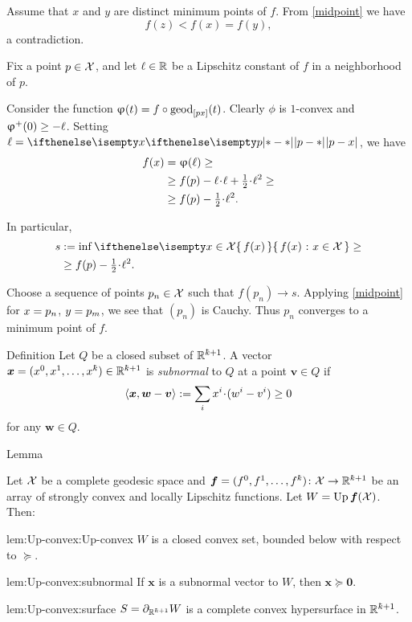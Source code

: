 Assume that $x$ and $y$ are distinct minimum points of $f$. 
From \ref{midpoint} we have
\[f(z)<f(x)=f(y),\] 
a contradiction. 

Fix a point $p\in \spc{X}$, and
let $\Lip\in\RR$ be a Lipschitz constant of $f$ in a neighborhood of $p$.

Consider the function $\phi(t)=f\circ\geod_{[px]}(t)$.
Clearly $\phi$ is $1$-convex and $\phi^+(0)\ge -\Lip$.
Setting $\ell=\dist{p}{x}{}$, we have 
\begin{align*}
f(x)
&=
\phi(\ell)
\ge
\\
&\ge
f(p)-\Lip\cdot\ell+\tfrac{1}{2}\cdot\ell^2
\ge
\\
&\ge f(p)-\tfrac{1}{2}\cdot{\Lip^2}.
\end{align*}

In particular,
\begin{align*}
s
&\df
\inf\set{f(x)}{x\in \spc{X}}
\ge
\\
&\ge
f(p)-\tfrac{1}{2}\cdot{\Lip^2}.
\end{align*}

Choose a sequence of points $p_n\in \spc{X}$ such that $f(p_n)\to s$.
Applying \ref{midpoint} for $x\z=p_n$, $y\z=p_m$, we see that $(p_n)$ is Cauchy. Thus $p_n$ converges to a minimum point of $f$.
\qeds

\begin{thm}{Definition}
Let $Q$ be a closed subset of $\RR^{\kay+1}$.
A vector $\bm{x}\z=(x^0,x^1,\dots,x^\kay)\in\RR^{\kay+1}$
is \emph{subnormal} to $Q$ at a point $\bm{v}\in Q$ 
if
\[\<\bm{x},\bm{w}-\bm{v}\>
\df
\sum_ix^i\cdot(w^i-v^i)
\ge 0\]
for any $\bm{w}\in Q$.
\end{thm}


\begin{thm}{Lemma}\label{lem:Up-convex}{\sloppy 
Let $\mathcal{X}$ be a complete geodesic space 
and $\bm{f}\z=(f^0,f^1,\dots,f^\kay)\:\spc{X}\to\RR^{\kay+1}$ 
be an array of strongly convex and locally Lipschitz functions.
Let $W=\mathop{\rm Up}\nolimits\bm{f}(\mathcal{X})$.
Then: 

}
\begin{subthm}{lem:Up-convex:Up-convex}
$W$ is a closed convex set, bounded below with respect to $\succcurlyeq$.
\end{subthm}

\begin{subthm}{lem:Up-convex:subnormal}
If $\bm{x}$ is a subnormal vector to $W$, then $\bm{x}\succcurlyeq\bm{0}$.
\end{subthm}

\begin{subthm}{lem:Up-convex:surface}
 $S=\Fr_{\RR^{\kay+1}}W$ is a complete convex hypersurface in $\RR^{\kay+1}$.
\end{subthm}

\end{thm}

